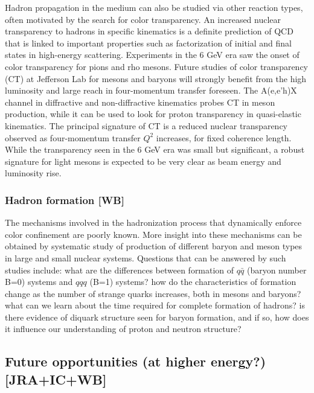 Hadron propagation in the medium can also be studied via other reaction types, often motivated by the search for color transparency. An increased nuclear transparency to hadrons in specific kinematics is a definite prediction of QCD that is linked to important properties such as factorization of initial and final states in high-energy scattering. Experiments in the 6 GeV era saw the onset of color transparency for pions and rho mesons. Future studies of color transparency (CT) at Jefferson Lab for mesons and baryons  will strongly benefit from the high luminosity and large reach in four-momentum transfer foreseen. The A(e,e'h)X channel in diffractive and non-diffractive kinematics probes CT in meson production, while it can be used to look for proton transparency in quasi-elastic kinematics. The principal signature of CT is a reduced nuclear transparency observed as four-momentum transfer $Q^2$ increases, for fixed coherence length. While the transparency seen in the 6 GeV era was small but significant, a robust signature for light mesons is expected to be very clear as beam energy and luminosity rise.

\subsubsection{Hadron formation [WB]}
The mechanisms involved in the hadronization process that dynamically enforce color confinement are poorly known. More insight into these mechanisms can be obtained by systematic study of production of different baryon and meson types in large and small nuclear systems. Questions that can be answered by such studies include: what are the differences between formation of $q\bar{q}$ (baryon number B=0) systems and $qqq$ (B=1) systems? how do the characteristics of formation change as the number of strange quarks increases, both in mesons and baryons? what can we learn about the time required for complete formation of hadrons? is there evidence of diquark structure seen for baryon formation, and if so, how does it influence our understanding of proton and neutron structure? 


\subsection{Future opportunities (at higher energy?) [JRA+IC+WB]} 


 



\newpage

